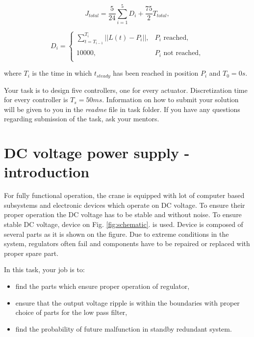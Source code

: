 \documentclass{article}
\begin{document}
	\begin{equation} \label{eq:total_cost}
	J_{total} = \frac{5}{24}\sum_{i=1}^{5} D_i + \frac{75}{2} T_{total},
	\end{equation}
	
	\begin{equation} \label{eq:distance_cost}
	D_i = \left\{
	\begin{array}{ll}
	\sum_{t=T_{i-1}}^{T_{i}} ||L(t) - P_i||, &  P_i \textrm{ reached}, \\
	& \\
	10000, &  P_i \textrm{ not reached},\\
	\end{array} 
	\right.
	\end{equation}
	
	\noindent
	where $T_i$ is the time in which $t_{steady}$ has been reached in position $P_i$ and $T_0 = 0s$.
	
	\vspace{10pt}
	\noindent
	Your task is to design five controllers, one for every actuator. 
	Discretization time for every controller is $T_s = 50ms$. Information on 
	how to submit your solution will be given to you in the \textit{readme} 
	file in task folder. If you have any questions regarding submission of the 
	task, ask your mentors.
	
\newpage
\section{DC voltage power supply - introduction}


For fully functional operation, the crane is equipped with 
lot of computer based subsystems and electronic devices which operate on DC 
voltage. To ensure their proper operation the DC voltage has to be stable and 
without noise. To ensure stable DC voltage, device on Fig. 
\ref{fig:schematic}. is used. Device is composed of several parts as it is 
shown on the figure. Due to extreme conditions in the system, regulators often 
fail and components have to be repaired or replaced with proper spare part.

In this task, your job is to:
\begin{itemize}
	\item find the parts which ensure proper operation of regulator, 
	\item ensure that the output voltage ripple is within the boundaries with 
	proper choice of parts for the low pass filter,
	\item find the probability of future malfunction in standby redundant 
	system.
\end{itemize}
\end{document}
